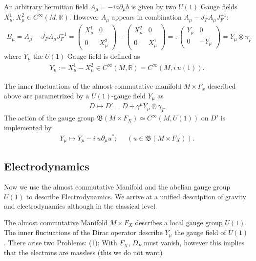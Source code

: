 An arbitrary hermitian field $A_\mu = -ia\partial _\mu b$  is given by
two
$U(1)$ Gauge fields $X_\mu^1, X_\mu^2 \in C^\infty(M, \mathbb{R})$.
However $A_\mu$ appears in combination $A_\mu - J_F A_\mu J_F^{-1}$:
\begin{align}
    B_\mu = A_\mu - J_F A_\mu J_F^{-1} =
    \begin{pmatrix}X_\mu^1&0\\0&X_\mu^2 \end{pmatrix}
        -
    \begin{pmatrix}X_\mu^2&0\\0&X_\mu^1 \end{pmatrix}
        =:
    \begin{pmatrix}Y_\mu&0\\0&-Y_\mu \end{pmatrix}=
        Y_\mu \otimes \gamma _F
\end{align}
where $Y_\mu$ the $U(1)$ Gauge field is defined as
\begin{align}
    Y_\mu := X_\mu^1 - X_\mu^2 \in C^\infty(M, \mathbb{R}) = C^\infty(M,
    i\ u(1)).
\end{align}

\begin{proposition}
    The inner fluctuations of the almost-commutative manifold $M\times
    F_x$ described above are parametrized by a $U(1)$-gauge field $Y_\mu$
    as
    \begin{align}
        D \mapsto D' = D + \gamma ^\mu Y_\mu \otimes \gamma_F
    \end{align}
    The action of the gauge group $\mathfrak{B}(M\times F_X) \simeq
    C^\infty (M, U(1))$ on $D'$ is implemented by
    \begin{align}
        Y_\mu \mapsto Y_\mu - i\ u\partial_\mu u^*; \;\;\;\;\; (u\in
        \mathfrak{B}(M\times F_X)).
    \end{align}
\end{proposition}

\subsection{Electrodynamics}
Now we use the almost commutative Manifold and the abelian gauge group
$U(1)$ to describe Electrodynamics. We arrive at a unified description of
gravity and electrodynamics although in the classical level.
\newline

The almost commutative Manifold $M\times F_X$ describes a local gauge group
$U(1)$. The inner fluctuations of the Dirac operator describe $Y_\mu$ the
gauge field of $U(1)$. There arise two Problems:
\newline
(1): With $F_X$, $D_F$ must vanish, however this implies that the electrons
are massless (this we do not want)
\newline

